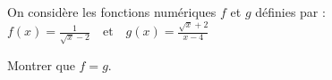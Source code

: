 \begin{Application}[][5 min]
\noindent
On considère les fonctions numériques $f$ et $g$ définies par :
$f(x) = \frac{1}{\sqrt{x}-2} \quad \text{et} \quad g(x) = \frac{\sqrt{x}+2}{x-4}$

Montrer que $f=g$.
\end{Application}
